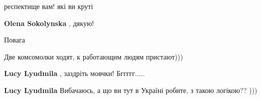 \begin{itemize}
 
респектище вам! які ви круті

 
\textbf{Olena Sokolynska} , дякую!

 
Повага

 
Две комсомолки ходят, к работающим людям пристают)))

\begin{itemize}
 
\textbf{Lucy Lyudmila} , заздріть мовчки! Бггггг.....

 
\textbf{Lucy Lyudmila}
Вибачаюсь, а що ви тут в Україні робите, з такою логікою?? )))

 

\end{itemize}
\end{itemize}

